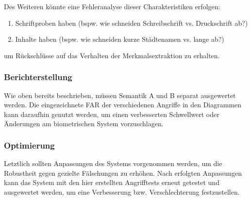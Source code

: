 \documentclass{article}
\begin{document}
Des Weiteren könnte eine Fehleranalyse dieser Charakteristiken erfolgen:

\begin{enumerate}
	\item Schriftproben haben (bspw. wie schneiden Schreibschrift vs. Druckschrift ab?) 
	\item Inhalte haben (bspw. wie schneiden kurze Städtenamen vs. lange ab?)
\end{enumerate}

um Rückschlüsse auf das Verhalten der Merkmalsextraktion zu erhalten.

\subsubsection{Berichterstellung}

Wie oben bereits beschrieben, müssen Semantik A und B separat ausgewertet werden. Die eingezeichnete FAR 
der verschiedenen Angriffe in den Diagrammen kann daraufhin genutzt werden, um einen verbesserten 
Schwellwert oder Änderungen am biometrischen System vorzuschlagen.

\subsubsection{Optimierung}

Letztlich sollten Anpassungen des Systems vorgenommen werden, um die Robustheit gegen gezielte Fälschungen 
zu erhöhen. Nach erfolgten Anpassungen kann das System mit den hier erstellten Angrifftests erneut 
getestet und ausgewertet werden, um eine Verbesserung bzw. Verschlechterung festzustellen.
\end{document}
